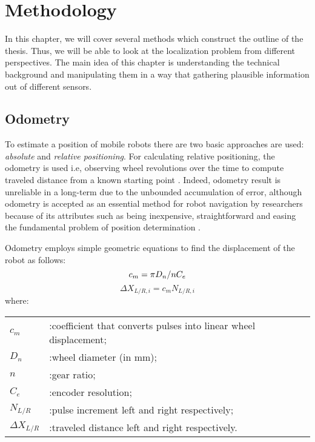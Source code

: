 \chapter{Methodology}\label{Method}
In this chapter, we will cover several methods which construct the outline of the thesis. Thus, we will be able to look at the localization problem from different perspectives. The main idea of this chapter is understanding the technical background and manipulating them in a way that gathering plausible information out of different sensors.
\section{Odometry}\label{sec:odom}
To estimate a position of mobile robots there are two basic approaches are used: \textit{absolute} and \textit{relative positioning}. For calculating relative positioning, the odometry is used i.e, observing wheel revolutions over the time to compute traveled distance from a known starting point \cite{odometry1}. Indeed, odometry result is unreliable in a long-term due to the unbounded accumulation of error, although odometry is accepted as an essential method for robot navigation by researchers because of its attributes such as being inexpensive, straightforward and easing the fundamental problem of position determination \cite{odometry2}. 
\\
\par Odometry employs simple geometric equations to find the displacement of the robot as follows:
\begin{equation}
    c_m = \pi D_n/nC_e \\
\end{equation}
\begin{equation}
    \Delta X_{L/R,i} = c_mN_{L/R,i} 
\end{equation}
where: \\
\begin{tabular}{l l}
    $c_m$ &:coefficient that converts pulses into linear wheel displacement; \\
    $D_n$ &:wheel diameter (in mm); \\
    $n$ &:gear ratio;\\
    $C_e$ &:encoder resolution;\\
    $N_{L/R}$ &:pulse increment left and right respectively;\\
    $\Delta X_{L/R}$ &:traveled distance left and right respectively.
\end{tabular}
